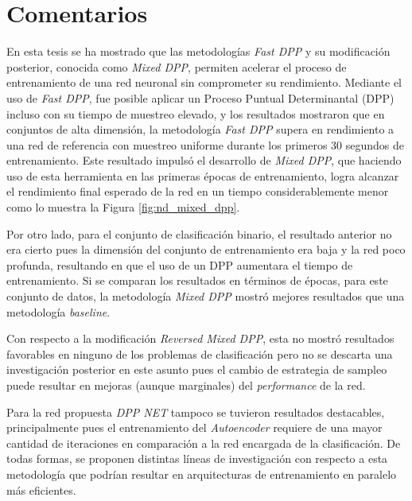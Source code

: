 \section{Comentarios}

En esta tesis se ha mostrado que las metodologías \textit{Fast DPP} y su modificación posterior, conocida como \textit{Mixed DPP}, permiten acelerar el proceso de entrenamiento de una red neuronal sin comprometer su rendimiento. Mediante el uso de \textit{Fast DPP}, fue posible aplicar un Proceso Puntual Determinantal (DPP) incluso con su tiempo de muestreo elevado, y los resultados mostraron que en conjuntos de alta dimensión, la metodología \textit{Fast DPP} supera en rendimiento a una red de referencia con muestreo uniforme durante los primeros 30 segundos de entrenamiento. Este resultado impulsó el desarrollo de \textit{Mixed DPP}, que haciendo uso de esta herramienta en las primeras épocas de entrenamiento, logra alcanzar el rendimiento final esperado de la red en un tiempo considerablemente menor como lo muestra la Figura \ref{fig:nd_mixed_dpp}.

\vspace{0.2cm}

Por otro lado, para el conjunto de clasificación binario, el resultado anterior no era cierto pues la dimensión del conjunto de entrenamiento era baja y la red poco profunda, resultando en que el uso de un DPP aumentara el tiempo de entrenamiento. Si se comparan los resultados en términos de épocas, para este conjunto de datos, la metodología \textit{Mixed DPP} mostró mejores resultados que una metodología \textit{baseline}.

\vspace{0.2cm}

Con respecto a la modificación \textit{Reversed Mixed DPP}, esta no mostró resultados favorables en ninguno de los problemas de clasificación pero no se descarta una investigación posterior en este asunto pues el cambio de estrategia de sampleo puede resultar en mejoras (aunque marginales) del \textit{performance} de la red. 

\vspace{0.2cm}

Para la red propuesta \textit{DPP NET} tampoco se tuvieron resultados destacables, principalmente pues el entrenamiento del \textit{Autoencoder} requiere de una mayor cantidad de iteraciones en comparación a la red encargada de la clasificación. De todas formas, se proponen distintas líneas de investigación con respecto a esta metodología que podrían resultar en arquitecturas de entrenamiento en paralelo más eficientes. 

